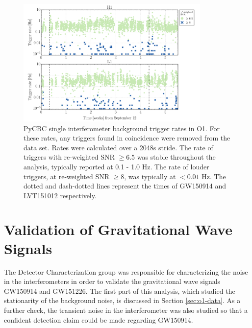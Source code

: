 \begin{figure}[ht!]%
\includegraphics[width=0.85\textwidth]{figures/O1/pycbc-rate-versus-time}
\caption[PyCBC trigger rates in O1]{PyCBC single interferometer background trigger %
         rates in O1. For these rates, any triggers found in coincidence %
         were removed from the data set. Rates were calculated over a 2048s stride. %
         The rate of triggers with %
         re-weighted SNR $\geq 6.5$ was stable throughout the analysis, typically %
         reported at 0.1 - 1.0 Hz. The rate of louder triggers, at re-weighted SNR %
         $\geq 8$, was typically at $< 0.01$ Hz. The dotted and dash-dotted lines %
         represent the times of GW150914 and LVT151012 respectively.
         }
\label{fig:pycbc-rate}
\end{figure}

\section{Validation of Gravitational Wave Signals}\label{sec:GW150914-validation}

The Detector Characterization group was responsible for characterizing the 
noise in the interferometers in order to validate the gravitational 
wave signals GW150914 and GW151226. The first part of this analysis, which studied the 
stationarity of the background noise, is discussed in Section \ref{sec:o1-data}. 
As a further 
check, the transient noise in the interferometer was also studied so that a 
confident detection claim could be made regarding GW150914. 

